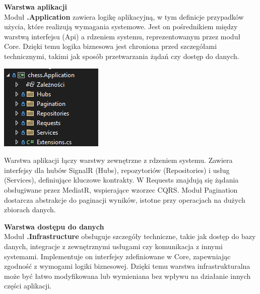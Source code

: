 \documentclass[12pt,a4paper]{article}
\begin{document}
\noindent \textbf{Warstwa aplikacji}\\
Moduł \textbf{.Application} zawiera logikę aplikacyjną, w tym definicje przypadków użycia, które realizują wymagania systemowe. Jest on pośrednikiem między warstwą interfejsu (Api) a rdzeniem systemu, reprezentowanym przez moduł Core. Dzięki temu logika biznesowa jest chroniona przed szczegółami technicznymi, takimi jak sposób przetwarzania żądań czy dostęp do danych.

\vspace{0.5cm}
\begin{minipage}[t]{0.45\textwidth}
    \vspace{0pt}
    \centering
    \includegraphics[width=\linewidth]{images/struktura_back_application.png} 
\end{minipage}
\hfill
\begin{minipage}[t]{0.45\textwidth}
    \vspace{0pt}
    \raggedright
    Warstwa aplikacji łączy warstwy zewnętrzne z rdzeniem systemu. Zawiera interfejsy dla hubów SignalR (Hubs), repozytoriów (Repositories) i usług (Services), definiujące kluczowe kontrakty. W Requests znajdują się żądania obsługiwane przez MediatR, wspierające wzorzec CQRS. Moduł Pagination dostarcza abstrakcje do paginacji wyników, istotne przy operacjach na dużych zbiorach danych.
\end{minipage}

\newpage

\noindent \textbf{Warstwa dostępu do danych}\\
Moduł \textbf{.Infrastructure} obsługuje szczegóły techniczne, takie jak dostęp do bazy danych, integracje z zewnętrznymi usługami czy komunikacja z innymi systemami. Implementuje on interfejsy zdefiniowane w Core, zapewniając zgodność z wymogami logiki biznesowej. Dzięki temu warstwa infrastrukturalna może być łatwo modyfikowana lub wymieniana bez wpływu na działanie innych części aplikacji.
\end{document}
